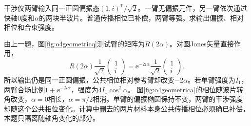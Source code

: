 \begin{exercise}\label{ex:o4geometricphase}
干涉仪两臂输入同一正圆偏振态$(1,i)^{\mathsf T}/\sqrt2$。一臂无偏振元件，另一臂依次通过快轴0度和$\alpha$的两块半波片。普通传播相位已补偿，两臂等强。求输出偏振、相对相位和合束强度。
\end{exercise}
\begin{solution}
由上一题，图\ref{fig:o4geometricq}测试臂的矩阵为$R(2\alpha)$。对圆Jones矢量直接作用，
\[
 R(2\alpha)\frac1{\sqrt2}\begin{pmatrix}1\\i\end{pmatrix}
 =\ee^{-2i\alpha}\frac1{\sqrt2}\begin{pmatrix}1\\i\end{pmatrix}.
\]
所以输出仍是同一正圆偏振，公共相位相对参考臂却改变$-2\alpha$。若单臂强度为$I_1$，两臂合场比例$1+\ee^{-2i\alpha}$，强度为$4I_1\cos^2\alpha$。
图\ref{fig:o4geometrica}的相位随波片转角改变，$\alpha=0$相长，$\alpha=\pi/2$相消。单臂的偏振椭圆保持不变，两臂的干涉强度却随这个公共相位变化。计算中删去的两片材料本身公共传播相位必须确已补偿，本题只隔离随轴角变化的部分。
\end{solution}
